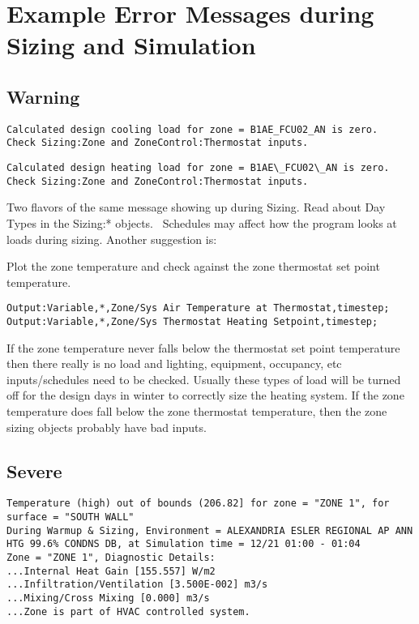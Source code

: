 \section{Example Error Messages during Sizing and Simulation}\label{example-error-messages-during-sizing-and-simulation}

\subsection{Warning}\label{warning}

\begin{lstlisting}
Calculated design cooling load for zone = B1AE_FCU02_AN is zero.
Check Sizing:Zone and ZoneControl:Thermostat inputs.
\end{lstlisting}

\begin{lstlisting}
Calculated design heating load for zone = B1AE\_FCU02\_AN is zero.
Check Sizing:Zone and ZoneControl:Thermostat inputs.
\end{lstlisting}

Two flavors of the same message showing up during Sizing. Read about Day Types in the Sizing:* objects.~ Schedules may affect how the program looks at loads during sizing. Another suggestion is:

Plot the zone temperature and check against the zone thermostat set point temperature.

\begin{lstlisting}
Output:Variable,*,Zone/Sys Air Temperature at Thermostat,timestep;
Output:Variable,*,Zone/Sys Thermostat Heating Setpoint,timestep;
\end{lstlisting}

If the zone temperature never falls below the thermostat set point temperature then there really is no load and lighting, equipment, occupancy, etc inputs/schedules need to be checked. Usually these types of load will be turned off for the design days in winter to correctly size the heating system. If the zone temperature does fall below the zone thermostat temperature, then the zone sizing objects probably have bad inputs.

\subsection{Severe}\label{severe}

\begin{lstlisting}
Temperature (high) out of bounds (206.82] for zone = "ZONE 1", for surface = "SOUTH WALL"
During Warmup & Sizing, Environment = ALEXANDRIA ESLER REGIONAL AP ANN HTG 99.6% CONDNS DB, at Simulation time = 12/21 01:00 - 01:04
Zone = "ZONE 1", Diagnostic Details:
...Internal Heat Gain [155.557] W/m2
...Infiltration/Ventilation [3.500E-002] m3/s
...Mixing/Cross Mixing [0.000] m3/s
...Zone is part of HVAC controlled system.
\end{lstlisting}

